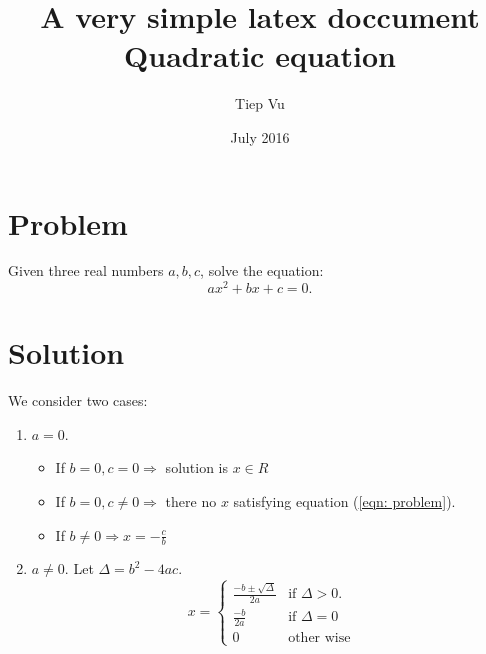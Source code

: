 \documentclass[10pt]{article}
\title{A very simple latex doccument \\
\textbf{Quadratic equation}}
\author{Tiep Vu}
\date{July 2016}
\begin{document}
\maketitle

\section{Problem} %
\label{sec:problem}
	Given three real numbers $a, b, c$, solve the equation: 
	\begin{equation}
	\label{eqn: problem}
	    ax^2 + bx + c = 0.
	\end{equation}

\section{Solution} %
\label{sec:solution}
We consider two cases: 
\begin{enumerate}
	\item $a = 0$.
	\begin{itemize}
		\item If $ b = 0, c = 0 \Rightarrow$ solution is $x \in R$ 

		\item If $ b = 0, c \neq 0 \Rightarrow$ there no $x$ satisfying equation 
		(\ref{eqn: problem}). 

		\item If $\displaystyle b \neq 0 \Rightarrow x = -\frac{c}{b}$
	\end{itemize}
	\item $a \neq 0$. Let $\Delta = b^2 - 4ac.$
	\begin{equation}
	\label{eqn:solution}
		\displaystyle
	    x = \left\{
	    	\begin{array} {cl}	    		
	    		\displaystyle \frac{-b \pm \sqrt{\Delta}}{2a} & \text{if~} \Delta > 0. \\
	    		\displaystyle \frac{-b}{2a}                   & \text{if~} \Delta = 0 \\
	    		\displaystyle 0                               & \text{other wise}
	    	\end{array}
		    \right. 	
	\end{equation}
\end{enumerate}
\end{document}
